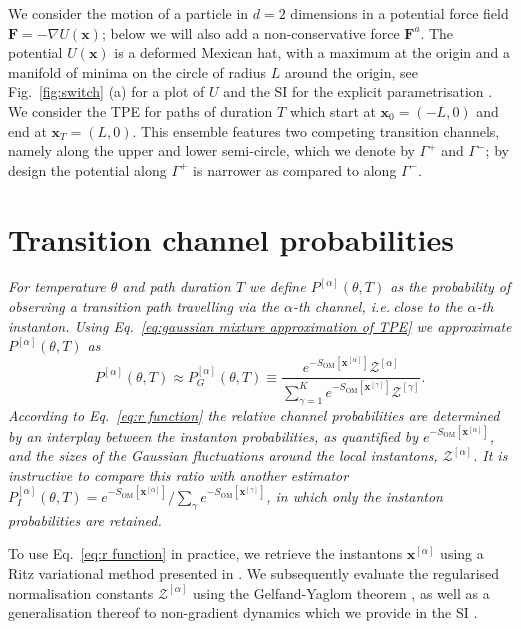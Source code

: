 We consider the motion of a particle in $d=2$
dimensions in a potential force field $\mathbf{F}=-\nabla U(\mathbf{x})$;
below we will also add a non-conservative force $\mathbf{F}^{a}$.
The potential $U(\mathbf{x})$ is a deformed Mexican hat, with a maximum
at the origin and a manifold of minima on the circle of radius $L$
around the origin, see Fig.~\ref{fig:switch} (a) for a plot of $U$
and the SI for the explicit parametrisation \citep{note:SI}. We consider
the TPE for paths of duration $T$ which start at $\mathbf{x}_{0}=(-L,0)$
and end at $\mathbf{x}_{T}=(L,0)$. This ensemble features two competing
transition channels, namely along the upper and lower semi-circle,
which we denote by $\Gamma^{+}$ and $\Gamma^{-}$; by design the
potential along $\Gamma^{+}$ is narrower as compared to along $\Gamma^{-}$.


\section{Transition channel probabilities}

\textit{\emph{For temperature
$\theta$ and path duration $T$ we define $P^{[\alpha]}(\theta,T)$
as the probability of observing a transition path travelling via the
$\alpha$-th channel, i.e.}}$~$\textit{\emph{close to the $\alpha$-th
instanton. Using Eq.}}~\textit{\emph{\eqref{eq:gaussian mixture approximation of TPE}
we approximate $P^{[\alpha]}(\theta,T)$ as}}
\begin{equation}
P^{[\alpha]}(\theta,T)\approx P_{G}^{[\alpha]}(\theta,T)\equiv\frac{e^{-S_{\text{OM}}[\mathbf{x}^{[\alpha]}]}\mathcal{Z}^{[\alpha]}}{\sum_{\gamma=1}^{K}e^{-S_{\text{OM}}[\mathbf{x}^{[\gamma]}]}\mathcal{Z}^{[\gamma]}}.\label{eq:r function}
\end{equation}
\textit{\emph{ According to Eq.}}~\textit{\emph{\eqref{eq:r function}
the relative channel probabilities are determined by an interplay
between the instanton probabilities, as quantified by $e^{-S_{\text{OM}}[\mathbf{x}^{[\alpha]}]}$,
and the sizes of the Gaussian fluctuations around the local instantons,
$\mathcal{Z}^{[\alpha]}$. It is instructive to compare this ratio
with another estimator $P_{I}^{[\alpha]}(\theta,T)=e^{-S_{\text{OM}}[\mathbf{x}^{[\alpha]}]}/\sum_{\gamma}e^{-S_{\text{OM}}[\mathbf{x}^{[\gamma]}]}$,
in which only the instanton probabilities are retained.}}

To use Eq.~\eqref{eq:r function} in practice, we retrieve the instantons
$\mathbf{x}^{[\alpha]}$ using a Ritz variational method presented
in \citep{kikuchiRitzMethodTransition2020,gladrowExperimentalMeasurementRelative2021}.\textit{\emph{
}}We subsequently evaluate the regularised normalisation constants
\textit{\emph{$\mathcal{Z}^{[\alpha]}$}} using the Gelfand-Yaglom
theorem \citep{dunneFunctionalDeterminantsQuantum2008,gelfandIntegrationFunctionalSpaces1960,levitTheoremInfiniteProducts1977,corazzaNormalizedGaussianPath2020a},
as well as a generalisation thereof to non-gradient dynamics which
we provide in the SI \citep{note:SI}.

